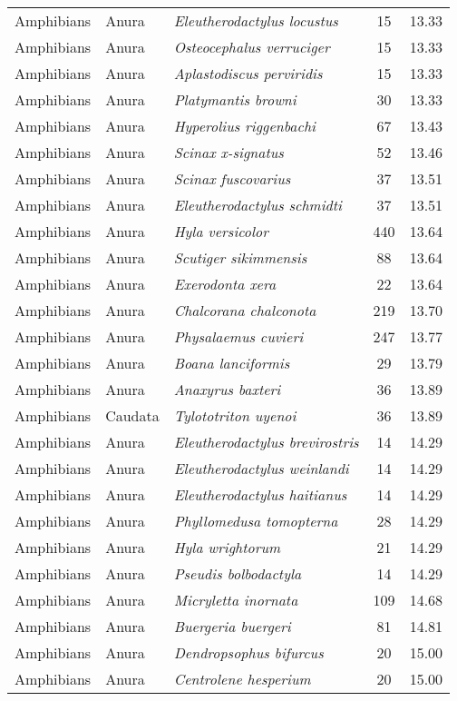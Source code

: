\begin{longtable}{ll>{\itshape}lcc}
  Amphibians & Anura & Eleutherodactylus locustus &  15 & 13.33 \\ 
  Amphibians & Anura & Osteocephalus verruciger &  15 & 13.33 \\ 
  Amphibians & Anura & Aplastodiscus perviridis &  15 & 13.33 \\ 
  Amphibians & Anura & Platymantis browni &  30 & 13.33 \\ 
  Amphibians & Anura & Hyperolius riggenbachi &  67 & 13.43 \\ 
  Amphibians & Anura & Scinax x-signatus &  52 & 13.46 \\ 
  Amphibians & Anura & Scinax fuscovarius &  37 & 13.51 \\ 
  Amphibians & Anura & Eleutherodactylus schmidti &  37 & 13.51 \\ 
  Amphibians & Anura & Hyla versicolor & 440 & 13.64 \\ 
  Amphibians & Anura & Scutiger sikimmensis &  88 & 13.64 \\ 
  Amphibians & Anura & Exerodonta xera &  22 & 13.64 \\ 
  Amphibians & Anura & Chalcorana chalconota & 219 & 13.70 \\ 
  Amphibians & Anura & Physalaemus cuvieri & 247 & 13.77 \\ 
  Amphibians & Anura & Boana lanciformis &  29 & 13.79 \\ 
  Amphibians & Anura & Anaxyrus baxteri &  36 & 13.89 \\ 
  Amphibians & Caudata & Tylototriton uyenoi &  36 & 13.89 \\ 
  Amphibians & Anura & Eleutherodactylus brevirostris &  14 & 14.29 \\ 
  Amphibians & Anura & Eleutherodactylus weinlandi &  14 & 14.29 \\ 
  Amphibians & Anura & Eleutherodactylus haitianus &  14 & 14.29 \\ 
  Amphibians & Anura & Phyllomedusa tomopterna &  28 & 14.29 \\ 
  Amphibians & Anura & Hyla wrightorum &  21 & 14.29 \\ 
  Amphibians & Anura & Pseudis bolbodactyla &  14 & 14.29 \\ 
  Amphibians & Anura & Micryletta inornata & 109 & 14.68 \\ 
  Amphibians & Anura & Buergeria buergeri &  81 & 14.81 \\ 
  Amphibians & Anura & Dendropsophus bifurcus &  20 & 15.00 \\ 
  Amphibians & Anura & Centrolene hesperium &  20 & 15.00 \\ 

\end{longtable}

